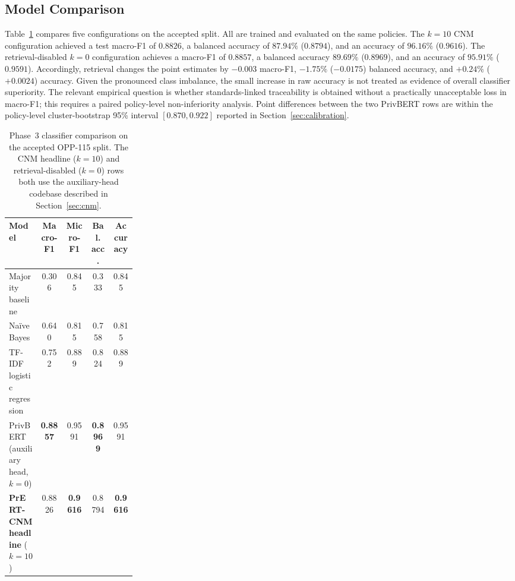 \documentclass[final,3p,times,twocolumn]{elsarticle}
\begin{document}
	\subsection{Model Comparison}
	\label{sec:model-comp} Table~\ref{tab:modelcomp} compares five configurations on
	the accepted split. All are trained and evaluated on the same policies. The $k=10$ 
    CNM configuration achieved a test macro-F1 of $0.8826$, a balanced accuracy of 
    $87.94\%$ ($0.8794$), and an accuracy of $96.16\%$ ($0.9616$). The retrieval-disabled $k=0$ configuration achieves a macro-F1 of $0.8857$, a balanced accuracy 
    $89.69\%$ ($0.8969$), and an accuracy of $95.91\%$ ($0.9591$). Accordingly, retrieval 
    changes the point estimates by $-0.003$ macro-F1, $-1.75\%$ ($-0.0175$) balanced 
    accuracy, and $+0.24\%$ ($+0.0024$) accuracy. Given the pronounced class imbalance, 
    the small increase in raw accuracy is not treated as evidence of overall classifier 
    superiority. The relevant empirical question is whether standards-linked traceability 
    is obtained without a practically unacceptable loss in macro-F1; this requires a 
    paired policy-level non-inferiority analysis. Point differences between the two PrivBERT rows are within the policy-level cluster-bootstrap 95\% interval $[0.870, 
    0.922]$ reported in Section~\ref{sec:calibration}.

	\begin{table}[h]
		\centering
		\caption{Phase~3 classifier comparison on the accepted OPP-115 split. The CNM
		headline ($k = 10$) and retrieval-disabled ($k = 0$) rows both use the auxiliary-head
		codebase described in Section~\ref{sec:cnm}.}
		\label{tab:modelcomp} 
        
        \footnotesize
		\setlength{\tabcolsep}{5pt}
		\begin{tabular}{@{}>{\raggedright\arraybackslash}p{0.25\linewidth}cccc@{}}
			\toprule \textbf{Model}                & \textbf{Macro-F1} & \textbf{Micro-F1} & \textbf{Bal. acc.} & \textbf{Accuracy} \\
			\midrule Majority baseline             & 0.306             & 0.845             & 0.333              & 0.845             \\
			Na\"ive Bayes                          & 0.640             & 0.815             & 0.758              & 0.815             \\
			TF-IDF logistic regression             & 0.752             & 0.889             & 0.824              & 0.889             \\
			PrivBERT (auxiliary head, $k = 0$)     & \textbf{0.8857}   & 0.9591            & \textbf{0.8969}    & 0.9591            \\
			\textbf{PrERT-CNM headline} ($k = 10$) & 0.8826            & \textbf{0.9616}   & 0.8794             & \textbf{0.9616}   \\
			\bottomrule
		\end{tabular}
	\end{table}
\end{document}
